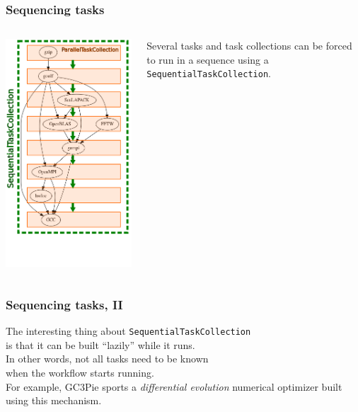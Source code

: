 \documentclass[english,serif,mathserif,xcolor=pdftex,dvipsnames,table]{beamer}
\begin{document}
\begin{frame}[fragile]
  \frametitle{Sequencing tasks}
  \begin{columns}
    \begin{column}{0.4\linewidth}
      \includegraphics[height=1.00\textheight]{fig/gzip3.png}
    \end{column}
    \begin{column}{0.6\linewidth}
      \begin{flushright}
        Several tasks and task collections can be forced to run in a
        sequence using a \texttt{SequentialTaskCollection}.
      \end{flushright}
    \end{column}
  \end{columns}
\end{frame}


\begin{frame}[fragile]
  \frametitle{Sequencing tasks, II}
  \begin{center}
    The interesting thing about \texttt{SequentialTaskCollection} \\
    is that it can be built ``lazily'' while it runs.
    \\ \+
    In other words, not all tasks need to be known \\ when the workflow
    starts running.
    \\ \+
    For example, GC3Pie sports a \emph{differential evolution}
    numerical optimizer built using this mechanism.
  \end{center}
\end{frame}
\end{document}
